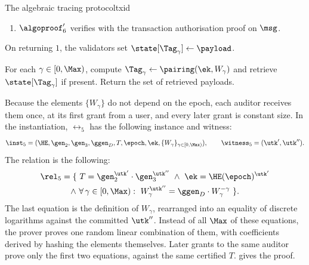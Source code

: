 \begin{protocolbox}{The algebraic tracing protocol}{txid}
\begin{description}
\begin{enumerate}
	\item $\algoproof_6'$ verifies with the transaction authorisation proof
on $\msg$.

      \end{enumerate}

      On returning $1$, the validators set $\state[\Tag_\gamma] \leftarrow
\payload$.

    \item[$\{\payload\} \leftarrow \IDidentify(\crs,\PTK,\ek,\epoch)$ :] For
each $\gamma \in [0,\Max)$, compute $\Tag_\gamma \leftarrow
\pairing(\ek,W_\gamma)$ and retrieve $\state[\Tag_\gamma]$ if present. Return
the set of retrieved payloads.

  \end{description}

\end{protocolbox}

Because the elements $\{W_\gamma\}$ do not
depend on the epoch, each auditor receives them once, at its first grant from a
user, and every later grant is constant size. In the instantiation,
$\rel_5$ has the following instance and witness:
%
\begin{equation*}
  \inst_5 = (\HE, \gen_2, \gen_3, \ggen_D, T, \epoch, \ek,
\{W_\gamma\}_{\gamma\in[0,\Max)}), \qquad \witness_5 = (\utk',\utk'').
\end{equation*}
%
The relation is the following:
%
\begin{equation*} \begin{gathered}
  \rel_5 = \{\ T = \gen_2^{\utk'}\cdot\gen_3^{\utk''} \ \wedge \ \ek =
\HE(\epoch)^{\utk'} \\ \wedge \ \forall\, \gamma \in [0,\Max): \
W_\gamma^{\utk''} = \ggen_D \cdot W_\gamma^{-\gamma}\ \}.
\end{gathered} \end{equation*}
%
The last equation is the definition of $W_\gamma$, rearranged into an equality
of discrete logarithms against the committed $\utk''$. Instead of all $\Max$
of these equations, the prover proves one random linear combination of them, with coefficients derived by hashing the elements themselves. Later
grants to the same auditor prove only the first two equations, against the same
certified $T$. \Cref{prot:txid-ek-proof} gives the proof.

